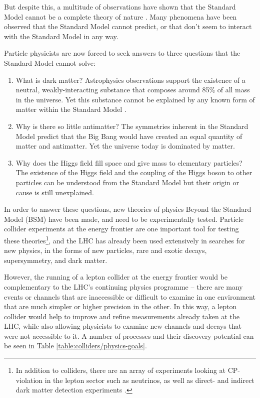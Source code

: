 But despite this, a multitude of observations \cite{sm-nonconservation} \cite{neutrino-oscillation} have shown that the Standard Model cannot be a complete theory of nature \cite{bsm-physics-summary}. Many phenomena have been observed that the Standard Model cannot predict, or that don't seem to interact with the Standard Model in any way.

Particle physicists are now forced to seek answers to three questions that the Standard Model cannot solve:

\begin{enumerate}
	\item What is dark matter? Astrophysics observations support the existence of a neutral, weakly-interacting substance that composes around 85\% of all mass in the universe. Yet this substance cannot be explained by any known form of matter within the Standard Model \cite{dark-matter-review}.
	\item Why is there so little antimatter? The symmetries inherent in the Standard Model predict that the Big Bang would have created an equal quantity of matter and antimatter. Yet the universe today is dominated by matter. \cite{cp-violation}
	\item Why does the Higgs field fill space and give mass to elementary particles? The existence of the Higgs field and the coupling of the Higgs boson to other particles can be understood from the Standard Model but their origin or cause is still unexplained.
\end{enumerate}

In order to answer these questions, new theories of physics Beyond the Standard Model (\acrshort{BSM}) have been made, and need to be experimentally tested. Particle collider experiments at the energy frontier are one important tool for testing these theories\footnote{In addition to colliders, there are an array of experiments looking at CP-violation in the lepton sector such as neutrinos, as well as direct- and indirect dark matter detection experiments \cite{neutrino-bsm-white-paper} \cite{dark-matter-direct}.}, and the \acrfull{LHC} has already been used extensively in searches for new physics, in the forms of new particles, rare and exotic decays, supersymmetry, and dark matter.

However, the running of a lepton collider at the energy frontier would be complementary to the \acrshort{LHC}'s continuing physics programme -- there are many events or channels that are inaccessible or difficult to examine in one environment that are much simpler or higher precision in the other. In this way, a lepton collider would help to improve and refine measurements already taken at the \acrshort{LHC}, while also allowing physicists to examine new channels and decays that were not accessible to it. A number of processes and their discovery potential can be seen in Table \ref{table:colliders/physics-goals}. %

